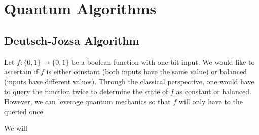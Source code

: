 \documentclass{../quantum.tex}
\begin{document}
\section{Quantum Algorithms}

\subsection{Deutsch-Jozsa Algorithm}

Let $f: \{0,1\} \rightarrow \{0,1\}$ be a boolean function with one-bit input. We would like to ascertain if $f$ is either constant (both inputs have the same value) or balanced (inputs have different values). Through the classical perspective, one would have to query the function twice to determine the state of $f$ as constant or balanced. However, we can leverage quantum mechanics so that $f$ will only have to the queried once.

We will 
\end{document}
